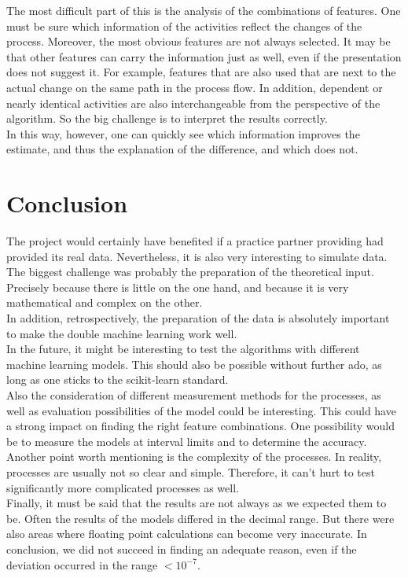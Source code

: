     The most difficult part of this is the analysis of the combinations of features. One must be sure which information of the activities reflect the changes of the process. Moreover, the most obvious features are not always selected. It may be that other features can carry the information just as well, even if the presentation does not suggest it. For example, features that are also used that are next to the actual change on the same path in the process flow. In addition, dependent or nearly identical activities are also interchangeable from the perspective of the algorithm. So the big challenge is to interpret the results correctly.\\
    In this way, however, one can quickly see which information improves the estimate, and thus the explanation of the difference, and which does not.

\clearpage
\chapter{Conclusion}
The project would certainly have benefited if a practice partner providing had provided its real data. Nevertheless, it is also very interesting to simulate data.\\
The biggest challenge was probably the preparation of the theoretical input. Precisely because there is little on the one hand, and because it is very mathematical and complex on the other.\\
In addition, retrospectively, the preparation of the data is absolutely important to make the double machine learning work well.\\
In the future, it might be interesting to test the algorithms with different machine learning models. This should also be possible without further ado, as long as one sticks to the scikit-learn standard.\\
Also the consideration of different measurement methods for the processes, as well as evaluation possibilities of the model could be interesting. This could have a strong impact on finding the right feature combinations. One possibility would be to measure the models at interval limits and to determine the accuracy.\\
Another point worth mentioning is the complexity of the processes. In reality, processes are usually not so clear and simple. Therefore, it can't hurt to test significantly more complicated processes as well.\\
Finally, it must be said that the results are not always as we expected them to be. Often the results of the models differed in the decimal range. But there were also areas where floating point calculations can become very inaccurate. In conclusion, we did not succeed in finding an adequate reason, even if the deviation occurred in the range $<10^{-7}$.
\clearpage
